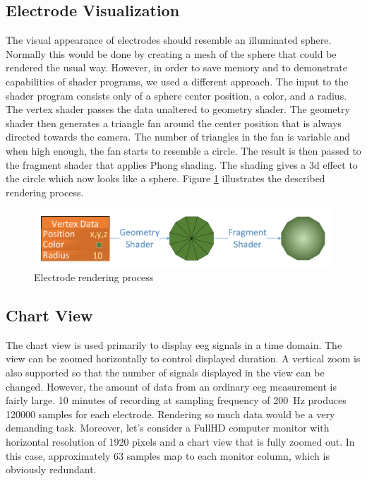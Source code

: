 \subsection{Electrode Visualization}
\label{ssec:implElVis}
The visual appearance of electrodes should resemble an illuminated sphere. Normally this would be done by creating a mesh of the sphere that could be rendered the usual way. However, in order to save memory and to demonstrate capabilities of shader programs, we used a different approach. The input to the shader program consists only of a sphere center position, a color, and a radius. The vertex shader passes the data unaltered to geometry shader. The geometry shader then generates a triangle fan around the center position that is always directed towards the camera. The number of triangles in the fan is variable and when high enough, the fan starts to resemble a circle. The result is then passed to the fragment shader that applies Phong shading. The shading gives a \gls{3d} effect to the circle which now looks like a sphere. Figure \ref{fig:ElRender} illustrates the described rendering process.

\begin{figure}[htb]
	\centering
	\includegraphics[width=1\linewidth]{fig/ElRender.pdf}
	\caption{Electrode rendering process}
	\label{fig:ElRender}
\end{figure}

\subsection{Chart View}
\label{ssec:ChartView}
The chart view is used primarily to display \gls{eeg} signals in a time domain. The view can be zoomed horizontally to control displayed duration. A vertical zoom is also supported so that the number of signals displayed in the view can be changed. However, the amount of data from an ordinary \gls{eeg} measurement is fairly large. 10 minutes of recording at sampling frequency of \SI{200}{\Hz} produces 120000 samples for each electrode. Rendering so much data would be a very demanding task. Moreover, let's consider a FullHD computer monitor with horizontal resolution of 1920 pixels and a chart view that is fully zoomed out. In this case, approximately 63 samples map to each monitor column, which is obviously redundant.

